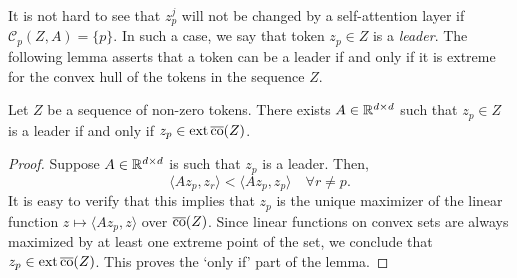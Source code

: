 \documentclass[11pt,a4paper]{amsart}
\begin{document}
It is not hard to see that $z_p^j$ will not be changed by a self-attention layer if $\mathcal{C}_p(Z,A) = \{ p \}$. In such a case, we say that token $z_p\in Z$ is a \textit{leader}. The following lemma asserts that a token can be a leader if and only if it is extreme for the convex hull of the tokens in the sequence $Z$.
\begin{lemma}\label{lem:howToLeader}
   Let $Z$ be a sequence of non-zero tokens. There exists $A\in \mathbb{R}^{d\times d}$ such that $z_p \in Z$ is a leader if and only if $z_p \in \operatorname{ext} \operatorname{\overline{co}} (Z)$.
\end{lemma}
\begin{proof}
Suppose $A\in \mathbb{R}^{d\times d}$ is such that $z_p$ is a leader. Then,
\begin{equation}
    \langle A z_p, z_r \rangle < \langle A z_p, z_p\rangle \quad \forall r\neq p.
\end{equation}
It is easy to verify that this implies that $z_p$ is the unique maximizer of the linear function $z \mapsto \langle Az_p, z\rangle$ over $\operatorname{\overline{co}}(Z)$. Since linear functions on convex sets are always maximized by at least one extreme point of the set, we conclude that $z_p \in \operatorname{ext} \operatorname{\overline{co}} (Z)$. This proves the `only if' part of the lemma.


\end{proof}
\end{document}
